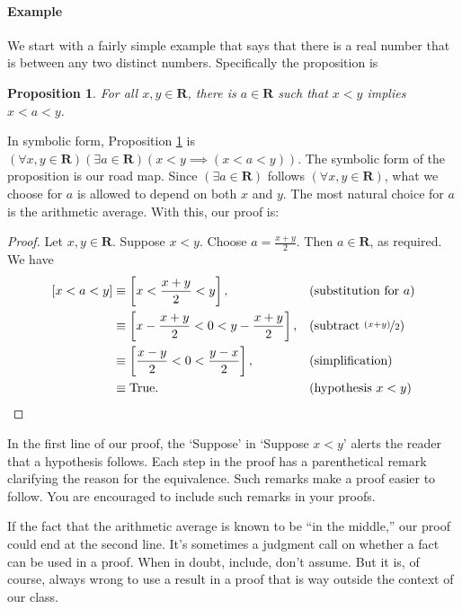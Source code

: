 \documentclass[12pt,fleqn]{article}
\newcommand{\reals}{\mathbf{R}}
\newcommand{\true}{\mathrm{True}}
\newenvironment{myproof}
  {\begin{shaded}\begin{proof}}
  {\end{proof}\end{shaded}}
\newtheorem{prop}{Proposition}
\newcounter{ex}\setcounter{ex}{0}
\newcommand{\ex}{%
\setcounter{ex}{\value{ex}+1}
\paragraph{Example \theex}}
\begin{document}
\ex We start with a fairly simple example that says that there is a 
real number that is between any two distinct numbers. Specifically
the proposition is
\begin{prop}
  For all $x,y \in \reals$, there is $a \in \reals$ such that
    $x < y$ implies $x<a<y$. \label{p1}   
\end{prop}
In symbolic form, Proposition \ref{p1} is
$\left(\forall x,y \in \reals \right) 
 \left( \exists a \in \reals \right)
\left(  x < y \implies \left(x < a < y \right) \right)$.  The symbolic form 
of the proposition is our road map. Since $\left(\exists a \in \reals \right)$ follows 
$\left(\forall x,y \in \reals \right)$, what we choose for $a$ is allowed to 
depend on both $x$ and $y$. The most natural choice for $a$ is the
arithmetic average. With this, our proof is:
\begin{myproof}
    Let $x,y \in \reals$. Suppose $x < y$. Choose $a = \frac{x+y}{2}$.
    Then $a \in \reals$, as required. We have
    \begin{align*}
      \left[ x < a < y \right] 
          &\equiv \left[ x < \frac{x+y}{2} < y \right], &&\text{(substitution for $a$)} \\
          & \equiv \left[ x - \frac{x+y}{2} < 0 < y - \frac{x+y}{2}  \right], &&\text{(subtract $\nicefrac{(x+y)}{2}$)} \\
          & \equiv \left[ \frac{x-y}{2} < 0 < \frac{y-x}{2}  \right], &&\text{(simplification)} \\
          & \equiv \true. && \text{(hypothesis $x < y$)} \qedhere
    \end{align*} 
\end{myproof}
In the first line of our proof, the `Suppose' in  `Suppose $x < y$' alerts the reader that a hypothesis follows.
Each step in the proof has a parenthetical remark clarifying the reason for the equivalence. Such remarks make 
a proof easier to follow.  You are encouraged to include such remarks in your proofs.

If the fact that the arithmetic average is known to be ``in the middle,'' our proof could end at 
the second line. It's sometimes a judgment call on whether a fact can be used in a proof. When in doubt, include, don't assume.
But it is, of course, always wrong to use a result in a proof  that is way outside the context of our class.
\end{document}
